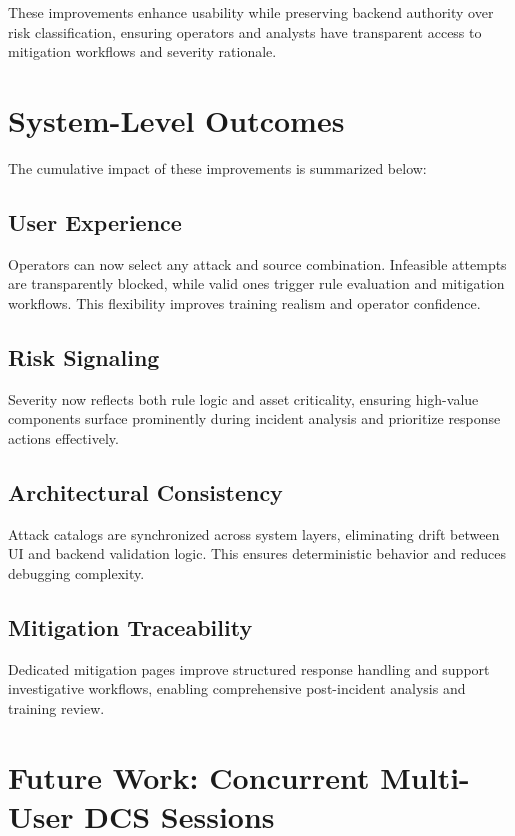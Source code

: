 \documentclass[12pt]{article}
\begin{document}
\begin{highlight}
These improvements enhance usability while preserving backend authority over risk classification, ensuring operators and analysts have transparent access to mitigation workflows and severity rationale.
\end{highlight}

\section{System-Level Outcomes}

The cumulative impact of these improvements is summarized below:

\subsection{User Experience}

Operators can now select any attack and source combination. Infeasible attempts are transparently blocked, while valid ones trigger rule evaluation and mitigation workflows. This flexibility improves training realism and operator confidence.

\subsection{Risk Signaling}

Severity now reflects both rule logic and asset criticality, ensuring high-value components surface prominently during incident analysis and prioritize response actions effectively.

\subsection{Architectural Consistency}

Attack catalogs are synchronized across system layers, eliminating drift between UI and backend validation logic. This ensures deterministic behavior and reduces debugging complexity.

\subsection{Mitigation Traceability}

Dedicated mitigation pages improve structured response handling and support investigative workflows, enabling comprehensive post-incident analysis and training review.

\section{Future Work: Concurrent Multi-User DCS Sessions}
\end{document}
